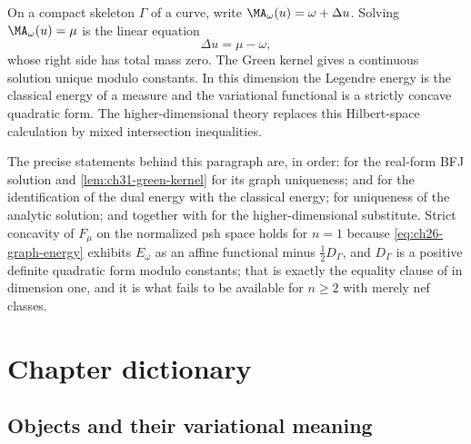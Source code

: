 \begin{example}
\label{ex:ch28-graph-case}
On a compact skeleton \(\Gamma\) of a curve, write
\(\MA_\omega(u)=\omega+\Delta u\).  Solving
\(\MA_\omega(u)=\mu\) is the linear equation
\[
                          \Delta u=\mu-\omega,
\]
whose right side has total mass zero.  The Green kernel gives a continuous
solution unique modulo constants.  In this dimension the Legendre energy is
the classical energy of a measure and the variational functional is a
strictly concave quadratic form.  The higher-dimensional theory replaces
this Hilbert-space calculation by mixed intersection inequalities.

The precise statements behind this paragraph are, in order:
 for the real-form BFJ solution
and \cref{lem:ch31-green-kernel} for its graph uniqueness;  and
 for the identification of the dual energy
with the classical energy;  for uniqueness
of the analytic solution; and
 together with
 for the higher-dimensional substitute.  Strict
concavity of \(F_\mu\) on the normalized psh space holds for \(n=1\) because
\eqref{eq:ch26-graph-energy} exhibits \(E_\omega\) as an affine functional
minus \(\tfrac12D_\Gamma\), and \(D_\Gamma\) is a positive definite
quadratic form modulo constants; that is exactly the equality clause of
 in dimension one, and it is what fails to be
available for \(n\geq2\) with merely nef classes.
\end{example}

\section{Chapter dictionary}
\label{sec:ch28-dictionary}

\subsection{Objects and their variational meaning}
\label{sec:ch28-dict-objects}

